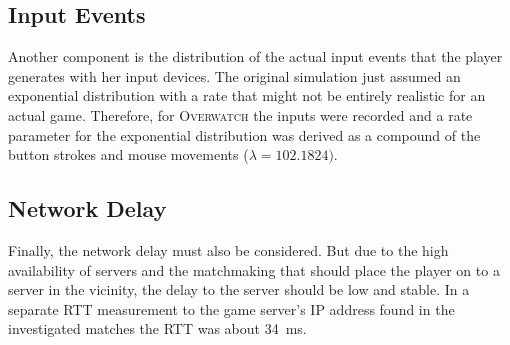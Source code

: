 



\subsection{Input Events}

Another component is the distribution of the actual input events that the player generates with her input devices. The original simulation just assumed an exponential distribution with a rate that might not be entirely realistic for an actual game. Therefore, for \textsc{Overwatch} the inputs were recorded and a rate parameter for the exponential distribution was derived as a compound of the button strokes and mouse movements ($\lambda = 102.1824)$.


\subsection{Network Delay}

Finally, the network delay must also be considered. But due to the high availability of servers and the matchmaking that should place the player on to a server in the vicinity, the delay to the server should be low and stable. In a separate RTT measurement to the game server's IP address found in the investigated matches the RTT was about \SI{34}{\milli\second}.


